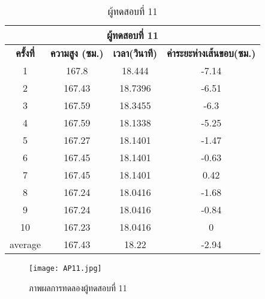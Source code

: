 \begin{table}[!hb] 
\centering
\caption{ผู้ทดสอบที่ 11}
\label{tab:11}
\begin{tabular}{|c|c|c|c|}
\hline
\multicolumn{4}{|c|}{\textbf{ผู้ทดสอบที่ 11}}    \\ \hline
\textbf{ครั้งที่} & \textbf{ความสูง (ซม.)} & \textbf{เวลา(วินาที)} & \textbf{ค่าระยะห่างเส้นขอบ(ซม.)}  \\ \hline
1       & 167.8  & 18.444  & -7.14   \\ \hline
2       & 167.43 & 18.7396 & -6.51     \\ \hline
3       & 167.59 & 18.3455 & -6.3     \\ \hline
4       & 167.59 & 18.1338 & -5.25   \\ \hline
5       & 167.27 & 18.1401 & -1.47     \\ \hline
6       & 167.45 & 18.1401 & -0.63   \\ \hline
7       & 167.45 & 18.1401 & 0.42     \\ \hline
8       & 167.24 & 18.0416 & -1.68   \\ \hline
9       & 167.24 & 18.0416 & -0.84   \\ \hline
10      & 167.23 & 18.0416 & 0        \\ \hline
average & 167.43 & 18.22   & -2.94   \\ \hline
\end{tabular}
\end{table}

\begin{figure}[!ht]
\centering
\texttt{[image: AP11.jpg]}
\caption{ภาพผลการทดลองผู้ทดสอบที่ 11 }
\label{fig:AP11.jpg}
\end{figure}


